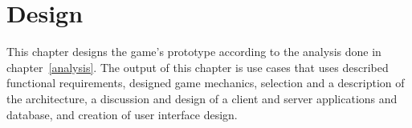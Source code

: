 \chapter{Design}
\label{chapter:design}

This chapter designs the game's prototype according to the analysis done in chapter~\ref{analysis}.
The output of this chapter is use cases that uses described functional requirements, designed game mechanics, selection and a description of the architecture, a discussion and design of a client and server applications and database, and creation of user interface design.


\pagebreak







